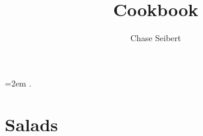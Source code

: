 \documentclass[landscape,12pt,openany]{book}
\begin{document}
\title{Cookbook}
\author{Chase Seibert}
\maketitle

\columnsep=2em
\setlength{\columnseprule}{0pt}.

\cleardoublepage
\tableofcontents

\chapter{Salads}



\listoffigures
\end{document}
